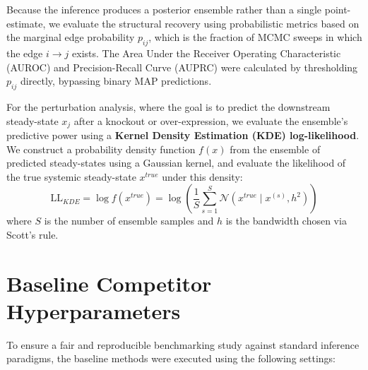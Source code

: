 \documentclass[10pt, aps, rmp,  twocolumn, superscriptaddress, floatfix, showkeys]{revtex4-2}
\begin{document}
Because the inference produces a posterior ensemble rather than a single point-estimate, we evaluate the structural recovery using probabilistic metrics based on the marginal edge probability $p_{ij}$, which is the fraction of MCMC sweeps in which the edge $i \to j$ exists. The Area Under the Receiver Operating Characteristic (AUROC) and Precision-Recall Curve (AUPRC) were calculated by thresholding $p_{ij}$ directly, bypassing binary MAP predictions.

For the perturbation analysis, where the goal is to predict the downstream steady-state $x_j$ after a knockout or over-expression, we evaluate the ensemble's predictive power using a \textbf{Kernel Density Estimation (KDE) log-likelihood}. We construct a probability density function $f(x)$ from the ensemble of predicted steady-states using a Gaussian kernel, and evaluate the likelihood of the true systemic steady-state $x^{true}$ under this density:
\begin{equation}
    \text{LL}_{KDE} = \log f(x^{true}) = \log \left( \frac{1}{S} \sum_{s=1}^S \mathcal{N}(x^{true} \mid x^{(s)}, h^2) \right)
\end{equation}
where $S$ is the number of ensemble samples and $h$ is the bandwidth chosen via Scott's rule.



\section{Baseline Competitor Hyperparameters}

To ensure a fair and reproducible benchmarking study against standard inference paradigms, the baseline methods were executed using the following settings:
\end{document}
